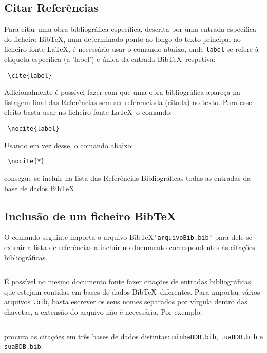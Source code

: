 \documentclass{article}%
\begin{document}
\subsection{Citar Referências}

Para citar uma obra bibliográfica específica, descrita por uma entrada específica do ficheiro Bib\TeX,
num determinado ponto  ao longo do texto principal no ficheiro fonte \LaTeX,
é necessário usar o  comando abaixo, onde \texttt{label} se refere à etiqueta específica (a 'label') e única
da entrada Bib\TeX\ respetiva:

\begin{verbatim} \cite{label}\end{verbatim}

Adicionalmente é possível fazer com que uma obra bibliográfica apareça na listagem final das Referências sem ser referenciada
(citada) no texto.
Para esse efeito basta usar no ficheiro fonte \LaTeX\ o comando:
\begin{verbatim} \nocite{label}\end{verbatim}
Usando em vez desse, o comando abaixo:
\begin{verbatim} \nocite{*}\end{verbatim}
consegue-se incluir na lista das Referências Bibliográficas todas as entradas da base de dados Bib\TeX.

\subsection{Inclusão de um ficheiro Bib\TeX}
O comando seguinte  importa o arquivo Bib\TeX  \texttt{'arquivoBib.bib'}  para dele se extrair a lista
de referências a incluir no documento correspondentes às citações bibliográficas.

\begin{verbatim}\end{verbatim}

É possível no mesmo documento fonte fazer citações de entradas bibliográficas que estejam contidas em bases de dados
Bib\TeX\ diferentes.
Para importar vários arquivos \texttt{.bib}, basta escrever os seus nomes separados por vírgula dentro das chavetas,
a extensão do arquivo não é necessária.
Por exemplo:
\begin{verbatim}\end{verbatim}
procura as citações em três bases de dados distintas: \texttt{minhaBDB.bib}, \texttt{tuaBDB.bib} e \texttt{suaBDB.bib}.
\end{document}
